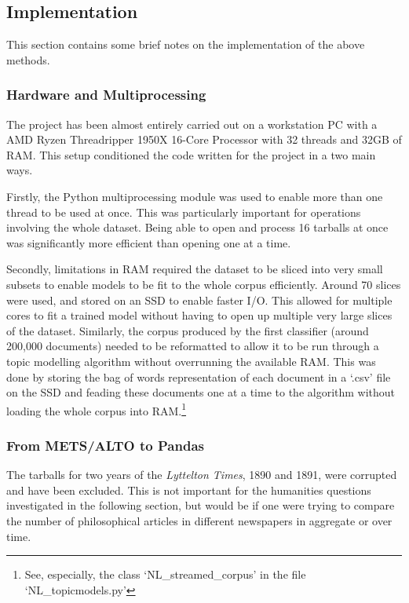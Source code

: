 \documentclass{article}
\begin{document}
\subsection{Implementation}\label{s:corpus-implementation}

This section contains some brief notes on the implementation of the above methods.

\subsubsection{Hardware and Multiprocessing}\label{s:corpus-implementation-multi}

The project has been almost entirely carried out on a workstation PC with a AMD Ryzen Threadripper 1950X 16-Core Processor with 32 threads and 32GB of RAM. This setup conditioned the code written for the project in a two main ways.

Firstly, the Python multiprocessing module was used to enable more than one thread to be used at once. This was particularly important for operations involving the whole dataset. Being able to open and process 16 tarballs at once was significantly more efficient than opening one at a time.

Secondly, limitations in RAM required the dataset to be sliced into very small subsets to enable models to be fit to the whole corpus efficiently. Around 70 slices were used, and stored on an SSD to enable faster I/O. This allowed for multiple cores to fit a trained model without having to open up multiple very large slices of the dataset. Similarly, the corpus produced by the first classifier (around 200,000 documents) needed to be reformatted to allow it to be run through a topic modelling algorithm without overrunning the available RAM. This was done by storing the bag of words representation of each document in a `.csv' file on the SSD and feading these documents one at a time to the algorithm without loading the whole corpus into RAM.\footnote{See, especially, the class `NL\_\-streamed\_\-corpus' in the file `NL\_\-topicmodels.py'}

\subsubsection{From METS/ALTO to Pandas}

The tarballs for two years of the \textit{Lyttelton Times}, 1890 and 1891, were corrupted and have been excluded. This is not important for the humanities questions investigated in the following section, but would be if one were trying to compare the number of philosophical articles in different newspapers in aggregate or over time.
\end{document}
